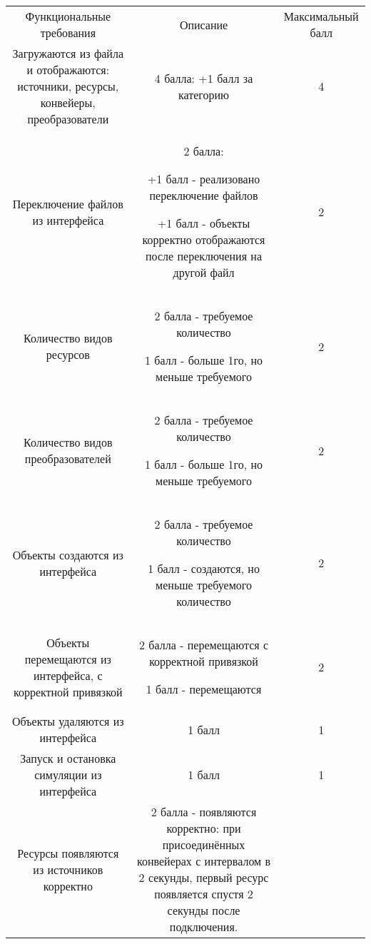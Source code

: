 \markSection

\begin{tabular}{|c|c|c|} 
    Функциональные требования & Описание & Максимальный балл \\	
    Загружаются из файла и отображаются: источники, ресурсы, конвейеры, преобразователи	& 4 балла: 
+1 балл за категорию & 4 \\
    Переключение файлов из интерфейса & 2 балла:

    +1 балл - реализовано переключение файлов

    +1 балл - объекты корректно отображаются после переключения на другой файл & 2 \\

    Количество видов ресурсов & 2 балла - требуемое количество

    1 балл - больше 1го, но меньше требуемого & 2 \\
    
    Количество видов преобразователей & 2 балла - требуемое количество
    
    1 балл - больше 1го, но меньше требуемого & 2 \\

    Объекты создаются из интерфейса	& 2 балла - требуемое количество
    
    1 балл - создаются, но меньше требуемого количество & 2 \\
    Объекты перемещаются из интерфейса, с корректной привязкой & 2 балла - перемещаются с корректной привязкой

    1 балл - перемещаются & 2 \\
    Объекты удаляются из интерфейса & 1 балл & 1 \\

    Запуск и остановка симуляции из интерфейса & 1 балл & 1 \\ 
    Ресурсы появляются из источников корректно & 2 балла - появляются корректно: при присоединённых конвейерах с интервалом в 2 секунды, первый ресурс появляется спустя 2 секунды после подключения.



\end{tabular}
